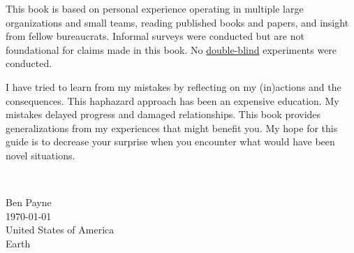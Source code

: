 This book is based on personal experience operating in multiple large organizations and small teams, reading published books and papers, and insight from fellow bureaucrats. Informal surveys were conducted but are not foundational for claims made in this book. 
No \href{https://en.wikipedia.org/wiki/Blinded_experiment}{double-blind}%
experiments were conducted. 









I have tried to learn from my mistakes by reflecting on my (in)actions and the consequences. This haphazard approach has been an expensive education. My mistakes delayed progress and damaged relationships. This book provides generalizations from my experiences that might benefit you. My hope for this guide is to decrease your surprise when you encounter what would have been novel situations.



\ \\

\begin{flushright}
Ben Payne\\
\today\\
United States of America\\
Earth
\end{flushright}


